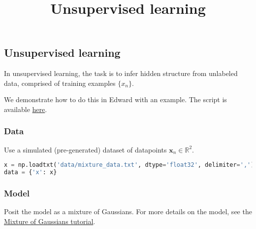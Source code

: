 \title{Unsupervised learning}

\subsection{Unsupervised learning}

In unsupervised learning, the task is to infer hidden structure from
unlabeled data, comprised of training examples $\{x_n\}$.

We demonstrate how to do this in Edward with an example.
The script is available
\href{https://github.com/blei-lab/edward/blob/master/examples/mixture_gaussian.py}
{here}.


\subsubsection{Data}

Use a simulated (pre-generated) dataset of datapoints
$\mathbf{x}_n\in\mathbb{R}^2$.
\begin{lstlisting}[language=Python]
x = np.loadtxt('data/mixture_data.txt', dtype='float32', delimiter=',')
data = {'x': x}
\end{lstlisting}


\subsubsection{Model}

Posit the model as a mixture of Gaussians. For more details on the
model, see the
\href{tut_mixture_gaussian.html}
{Mixture of Gaussians tutorial}.

